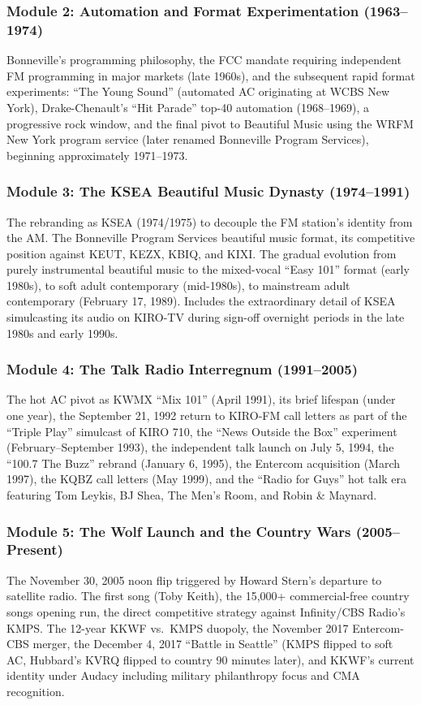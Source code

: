\documentclass[11pt,letterpaper]{article}
\begin{document}
\subsubsection{Module 2: Automation and Format Experimentation (1963--1974)}
Bonneville's programming philosophy, the FCC mandate requiring independent FM programming in major markets (late 1960s), and the subsequent rapid format experiments: ``The Young Sound'' (automated AC originating at WCBS New York), Drake-Chenault's ``Hit Parade'' top-40 automation (1968--1969), a progressive rock window, and the final pivot to Beautiful Music using the WRFM New York program service (later renamed Bonneville Program Services), beginning approximately 1971--1973.

\subsubsection{Module 3: The KSEA Beautiful Music Dynasty (1974--1991)}
The rebranding as KSEA (1974/1975) to decouple the FM station's identity from the AM. The Bonneville Program Services beautiful music format, its competitive position against KEUT, KEZX, KBIQ, and KIXI. The gradual evolution from purely instrumental beautiful music to the mixed-vocal ``Easy 101'' format (early 1980s), to soft adult contemporary (mid-1980s), to mainstream adult contemporary (February 17, 1989). Includes the extraordinary detail of KSEA simulcasting its audio on KIRO-TV during sign-off overnight periods in the late 1980s and early 1990s.

\subsubsection{Module 4: The Talk Radio Interregnum (1991--2005)}
The hot AC pivot as KWMX ``Mix 101'' (April 1991), its brief lifespan (under one year), the September 21, 1992 return to KIRO-FM call letters as part of the ``Triple Play'' simulcast of KIRO 710, the ``News Outside the Box'' experiment (February--September 1993), the independent talk launch on July 5, 1994, the ``100.7 The Buzz'' rebrand (January 6, 1995), the Entercom acquisition (March 1997), the KQBZ call letters (May 1999), and the ``Radio for Guys'' hot talk era featuring Tom Leykis, BJ Shea, The Men's Room, and Robin \& Maynard.

\subsubsection{Module 5: The Wolf Launch and the Country Wars (2005--Present)}
The November 30, 2005 noon flip triggered by Howard Stern's departure to satellite radio. The first song (Toby Keith), the 15,000+ commercial-free country songs opening run, the direct competitive strategy against Infinity/CBS Radio's KMPS. The 12-year KKWF vs.\ KMPS duopoly, the November 2017 Entercom-CBS merger, the December 4, 2017 ``Battle in Seattle'' (KMPS flipped to soft AC, Hubbard's KVRQ flipped to country 90 minutes later), and KKWF's current identity under Audacy including military philanthropy focus and CMA recognition.
\end{document}
